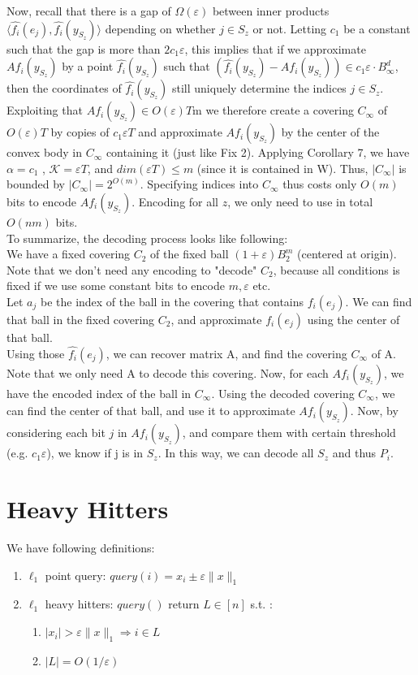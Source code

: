 \documentclass[11pt]{article}
\newcommand{\eps}{\varepsilon}
\begin{document}
Now, recall that there is a gap of $\Omega(\eps)$ between inner products $\langle \hat{f_i}(e_j), \hat{f_i}(y_{S_z}) \rangle$ depending on whether $j \in S_z$ or not. Letting $c_1$ be a constant such that the gap is more than $2c_1 \eps$, this implies that if we approximate $Af_i(y_{S_z})$ by a point $\hat{f_i}(y_{S_z})$ such that $(\hat{f_i}(y_{S_z}) - Af_i(y_{S_z})) \in c_1\eps \cdot B_{\infty}^d$, then the coordinates of $\hat{f_i}(y_{S_z})$ still uniquely determine the indices $j \in S_z$. Exploiting that $Af_i(y_{S_z}) \in O(\eps) T$m we therefore create a covering $C_{\infty}$ of $O(\eps)T$ by copies of $c_1\eps T$ and approximate $Af_i(y_{S_z})$ by the center of the convex body in $C_{\infty}$ containing it (just like Fix 2). Applying Corollary 7, we have $\alpha = c_1$ , $\mathcal{K} = \eps T$, and $dim(\eps T) \leq m$ (since it is contained in W). Thus, $|C_{\infty}|$ is bounded by $|C_{\infty}| = 2^{O(m)}$. Specifying indices into $C_{\infty}$ thus costs only $O(m)$ bits to encode $Af_i(y_{S_z})$. Encoding for all $z$, we only need to use in total $O(nm)$ bits. \\

To summarize, the decoding process looks like following: \\
We have a fixed covering $C_2$ of the fixed ball $(1+\eps)B_2^m$ (centered at origin). Note that we don't need any encoding to "decode" $C_2$, because all conditions is fixed if we use some constant bits to encode $m, \eps$ etc.\\
Let $a_j$ be the index of the ball in the covering that contains $f_i(e_j)$. We can find that ball in the fixed covering $C_2$, and approximate $f_i(e_j)$ using the center of that ball. \\
Using those $\hat{f_i}(e_j)$, we can recover matrix A, and find the covering $C_{\infty}$ of A. Note that we only need A to decode this covering. Now, for each $Af_i(y_{S_z})$, we have the encoded index of the ball in $C_{\infty}$. Using the decoded covering $C_{\infty}$, we can find the center of that ball, and use it to approximate $Af_i(y_{S_z})$. Now, by considering each bit $j$ in $Af_i(y_{S_z})$, and compare them with certain threshold (e.g. $c_1 \eps$), we know if j is in $S_z$. In this way, we can decode all $S_z$ and thus $P_i$. 

\section{Heavy Hitters}
We have following definitions:
\begin{enumerate}
	\item $\ell_1$ point query: $query(i) = x_i \pm \eps \|x\|_1$ 
    \item $\ell_1$ heavy hitters: $query()$ return $L \in [n]$ s.t. :
    	\begin{enumerate}
        	\item $|x_i| > \eps \|x\|_1 \Longrightarrow i \in L$
            \item $|L| = O(1/\eps)$
        \end{enumerate}
\end{enumerate}
\end{document}
